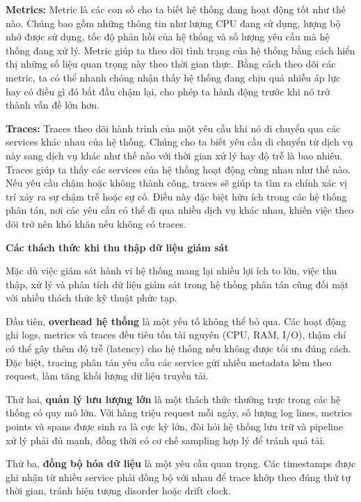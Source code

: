 \documentclass{uetgraduation}
\begin{document}
\textbf{Metrics:} Metric là các con số cho ta biết hệ thống đang hoạt động tốt như thế nào. Chúng bao gồm những thông tin như lượng CPU đang sử dụng, lượng bộ nhớ được sử dụng, tốc độ phản hồi của hệ thống và số lượng yêu cầu mà hệ thống đang xử lý. Metric giúp ta theo dõi tình trạng của hệ thống bằng cách hiển thị những số liệu quan trọng này theo thời gian thực. Bằng cách theo dõi các metric, ta có thể nhanh chóng nhận thấy hệ thống đang chịu quá nhiều áp lực hay có điều gì đó bắt đầu chậm lại, cho phép ta hành động trước khi nó trở thành vấn đề lớn hơn.

\textbf{Traces:} Traces theo dõi hành trình của một yêu cầu khi nó di chuyển qua các services khác nhau của hệ thống. Chúng cho ta biết yêu cầu di chuyển từ dịch vụ này sang dịch vụ khác như thế nào với thời gian xử lý hay độ trễ là bao nhiêu. Traces giúp ta thấy các services của hệ thống hoạt động cùng nhau như thế nào. Nếu yêu cầu chậm hoặc không thành công, traces sẽ giúp ta tìm ra chính xác vị trí xảy ra sự chậm trễ hoặc sự cố. Điều này đặc biệt hữu ích trong các hệ thống phân tán, nơi các yêu cầu có thể đi qua nhiều dịch vụ khác nhau, khiến việc theo dõi trở nên khó khăn nếu không có traces.

\textbf{Các thách thức khi thu thập dữ liệu giám sát}

Mặc dù việc giám sát hành vi hệ thống mang lại nhiều lợi ích to lớn, việc thu thập, xử lý và phân tích dữ liệu giám sát trong hệ thống phân tán cũng đối mặt với nhiều thách thức kỹ thuật phức tạp.

Đầu tiên, \textbf{overhead hệ thống} là một yếu tố không thể bỏ qua. Các hoạt động ghi logs, metrics và traces đều tiêu tốn tài nguyên (CPU, RAM, I/O), thậm chí có thể gây thêm độ trễ (latency) cho hệ thống nếu không được tối ưu đúng cách. Đặc biệt, tracing phân tán yêu cầu các service gửi nhiều metadata kèm theo request, làm tăng khối lượng dữ liệu truyền tải.

Thứ hai, \textbf{quản lý lưu lượng lớn} là một thách thức thường trực trong các hệ thống có quy mô lớn. Với hàng triệu request mỗi ngày, số lượng log lines, metrics points và spans được sinh ra là cực kỳ lớn, đòi hỏi hệ thống lưu trữ và pipeline xử lý phải đủ mạnh, đồng thời có cơ chế sampling hợp lý để tránh quá tải.

Thứ ba, \textbf{đồng bộ hóa dữ liệu} là một yêu cầu quan trọng. Các timestamps được ghi nhận từ nhiều service phải đồng bộ với nhau để trace khớp theo đúng thứ tự thời gian, tránh hiện tượng disorder hoặc drift clock.
\end{document}
